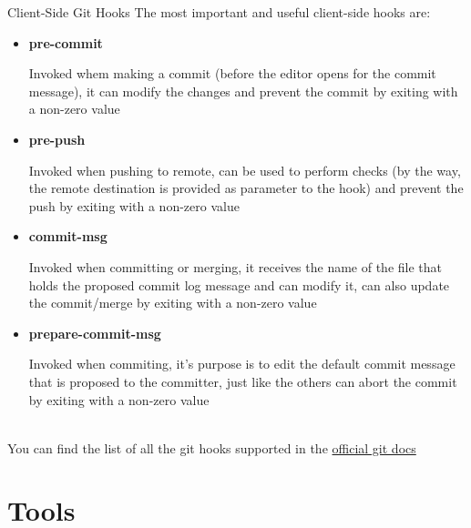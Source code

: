 \documentclass[11pt]{beamer}
\begin{document}
\begin{frame}{Client-Side Git Hooks}
  The most important and useful client-side hooks are:
  \begin{itemize}
    \item \textbf{pre-commit} \\
      \begin{tiny}
  		Invoked whem making a commit (before the editor opens for the commit message), it can modify the changes and
  		prevent the commit by exiting with a non-zero value
  		\par
      \end{tiny}
    \item \textbf{pre-push} \\
      \begin{tiny}
       Invoked when pushing to remote, can be used to perform checks (by the way, the remote destination is provided as parameter to
       the hook) and prevent the push by exiting with a non-zero value
       \par
      \end{tiny}
    \item \textbf{commit-msg} \\
	  \begin{tiny}
       Invoked when committing or merging, it receives the name of the file that holds the proposed commit log message and can modify it,
       can also update the commit/merge by exiting with a non-zero value
       \par
      \end{tiny}
    \item \textbf{prepare-commit-msg} \\
      \begin{tiny}
        Invoked when commiting, it's purpose is to edit the default commit message that is proposed to the committer,
        just like the others can abort the commit by exiting with a non-zero value 
        \par
      \end{tiny}
  \end{itemize}
  ~\\
  You can find the list of all the git hooks supported in the
  {\color{purple} \href{https://git-scm.com/docs/githooks\#_hooks}{official git docs}}
\end{frame}






\section{Tools}
\end{document}
